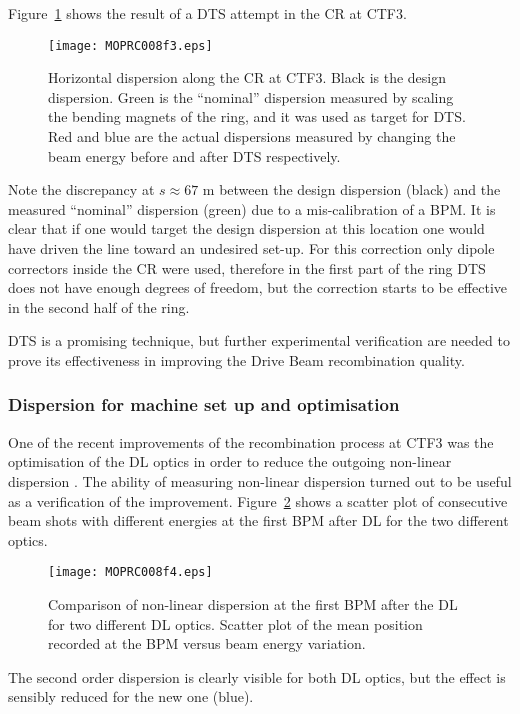 Figure~\ref{fig:CRDTS} shows the result of a DTS attempt in the CR at CTF3.
%
\begin{figure}[!htb]
   \centering
   \texttt{[image: MOPRC008f3.eps]}
   \caption{Horizontal dispersion along the CR at CTF3.
   Black is the design dispersion.
   Green is the ``nominal'' dispersion measured by scaling the bending magnets of the ring, and it was used as target for DTS.
   Red and blue are the actual dispersions measured by changing the beam energy before and after DTS respectively.}
   \label{fig:CRDTS}
\end{figure}
%
Note the discrepancy at $s \approx 67$ m between the design dispersion (black) and 
the measured ``nominal'' dispersion (green) due to a mis-calibration of a BPM. 
It is clear that if one would target the design dispersion at this location 
one would have driven the line toward an undesired set-up.
For this correction only dipole correctors inside the CR were used, 
therefore in the first part of the ring DTS does not have enough degrees of freedom,
but the correction starts to be effective in the second half of the ring.

DTS is a promising technique, but further experimental verification are needed to 
prove its effectiveness in improving the Drive Beam recombination quality.

\subsubsection{Dispersion for machine set up and optimisation}
%
One of the recent improvements of the recombination process at CTF3 was 
the optimisation of the DL optics in order to reduce the outgoing non-linear dispersion \cite{gambaIPAC16}.
The ability of measuring non-linear dispersion turned out to be useful as a verification of the improvement.
Figure~\ref{fig:DLnewOptics} shows a scatter plot of consecutive beam shots with different energies at 
the first BPM after DL for the two different optics.
%
\begin{figure}[!htb]
   \centering
   \texttt{[image: MOPRC008f4.eps]}
   \caption{Comparison of non-linear dispersion at the first BPM after the DL for two different DL optics.
   Scatter plot of the mean position recorded at the BPM versus beam energy variation.}
   \label{fig:DLnewOptics}
\end{figure}
The second order dispersion is clearly visible for both DL optics, but the effect is sensibly reduced for the new one (blue).


